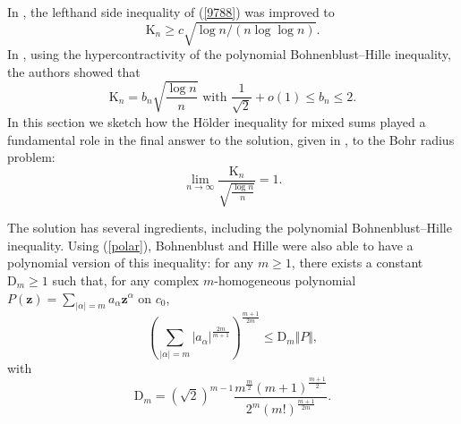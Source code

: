 \documentclass[10pt]{amsart}
\numberwithin{equation}{section}
\begin{document}
In \cite{DeFr06}, the lefthand side inequality of (\ref{9788}) was improved
to
\begin{equation*}
\mathrm{K}_{n}\geq c\sqrt{\log n/(n\log \log n)}.
\end{equation*}
In \cite{annals}, using the hypercontractivity of the polynomial
Bohnenblust--Hille inequality, the authors showed that\begin{equation}
\mathrm{K}_{n}=b_{n}\sqrt{\frac{\log n}{n}}\text{ with }\frac{1}{\sqrt{2}}+o(1)\leq b_{n}\leq 2.  \label{1212}
\end{equation}In this section we sketch how the H\"{o}lder inequality for mixed sums
played a fundamental role in the final answer to the solution, given in \cite{bps}, to the Bohr radius problem:
\begin{equation*}
\lim_{n\rightarrow \infty }\frac{\mathrm{K}_{n}}{\sqrt{\frac{\log n}{n}}}=1.
\end{equation*}

The solution has several ingredients, including the polynomial
Bohnenblust--Hille inequality. Using (\ref{polar}), Bohnenblust and Hille
were also able to have a polynomial version of this inequality: for any $m\geq 1$, there exists a constant $\mathrm{D}_{m}\geq 1$ such that, for any
complex $m$-homogeneous polynomial $P(\mathbf{z})=\sum_{|\alpha
|=m}a_{\alpha }\mathbf{z}^{\alpha }$ on $c_{0}$,
\begin{equation*}
\left( \sum_{|\alpha |=m}|a_{\alpha }|^{\frac{2m}{m+1}}\right) ^{\frac{m+1}{2m}}\leq \mathrm{D}_{m}\Vert P\Vert,
\end{equation*}
with
\begin{equation*}
\mathrm{D}_{m}=\left( \sqrt{2}\right) ^{m-1}\frac{m^{\frac{m}{2}}\left(
m+1\right) ^{\frac{m+1}{2}}}{2^{m}\left( m!\right) ^{\frac{m+1}{2m}}}.
\end{equation*}
\end{document}
